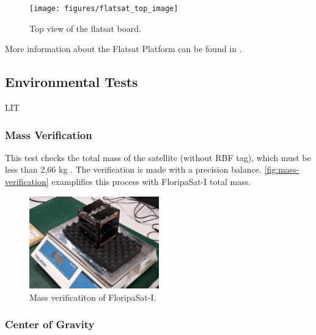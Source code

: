 \begin{figure}[!ht]
    \begin{center}
        \texttt{[image: figures/flatsat\_top\_image]}
        \caption{Top view of the flatsat board.}
        \label{fig:flatsat-top}
    \end{center}
\end{figure}

More information about the Flatsat Platform can be found in \cite{flatsat}.




\subsection{Environmental Tests}

LIT

\cite{marcelino2021}

\subsubsection{Mass Verification}

This test checks the total mass of the satellite (without RBF tag), which must be less than 2,66 kg \cite{cds}. The verification is made with a precision balance. \autoref{fig:mass-verification} examplifies this process with FloripaSat-I total mass.

\begin{figure}[!ht]
    \begin{center}
        \includegraphics[width=0.5\textwidth]{figures/mass-test}
        \caption{Mass verificatiton of FloripaSat-I.}
        \label{fig:mass-verification}
    \end{center}
\end{figure}

\subsubsection{Center of Gravity}

